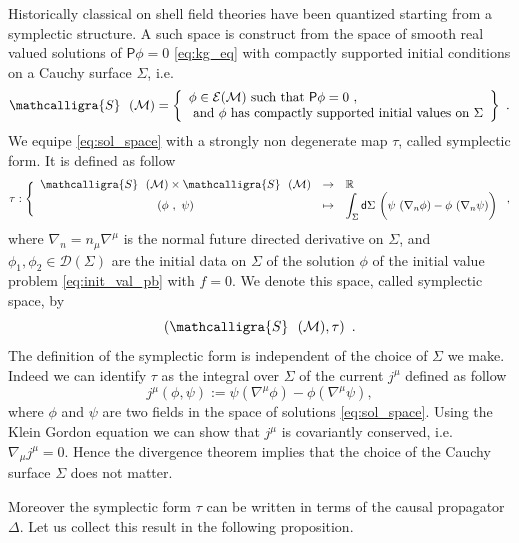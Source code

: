 \documentclass[11pt]{book}
\newcommand{\bigint}{\displaystyle\int}
\newcommand{\Dcal}{\mathcal{D}}
\newcommand{\Ecal}{\mathcal{E}}
\newcommand{\Mcal}{\mathcal{M}}
\newcommand{\Rbb}{\mathbb{R}}
\newcommand{\Psf}{\mathsf{P}}
\newcommand{\dsf}{\mathsf{d}}
\theoremstyle{break}
\begin{document}
Historically classical on shell field theories have been quantized starting from a symplectic structure. A such space is construct from the space of smooth real valued solutions of $\Psf \phi = 0$ \eqref{eq:kg_eq} with compactly supported initial conditions on a Cauchy surface $\Sigma$, i.e.
%
\begin{equation}
\mathcalligra{S} \ \ (\Mcal) = \left\{ 
\begin{array}{l}
\phi \in \Ecal(\Mcal) \mbox{ such that } \Psf\phi=0 \ , \\
\mbox{ and } \phi \mbox{ has compactly supported initial values on } \Sigma 
\end{array}
\right\} \ .
\label{eq:sol_space}
\end{equation}
%
We equipe \eqref{eq:sol_space} with a strongly non degenerate map $\tau$, called symplectic form. It is defined as follow
%
\begin{equation*}
\tau : \Bigg\{
\begin{array}{ccl}
\mathcalligra{S} \ \ (\Mcal) \times \mathcalligra{S} \ \ (\Mcal) & \to & \Rbb \\
(\phi \ , \ \psi) & \mapsto & \bigint_\Sigma  \dsf \Sigma \ \bigg( \psi \ (\nabla_n \phi) - \phi \ (\nabla_n \psi) \bigg)
\end{array}
\ ,
\end{equation*}
%
where $\nabla_n = n_\mu \nabla^\mu$ is the normal future directed derivative on $\Sigma$, and $\phi_1, \phi_2 \in \Dcal(\Sigma)$  are the initial data on $\Sigma$ of the solution $\phi$ of the initial value problem \eqref{eq:init_val_pb} with $f=0$. We denote this space, called symplectic space, by 
%
\begin{equation*}
\left(\mathcalligra{S} \ \ (\Mcal),\tau\right) \ . 
\end{equation*}
%
The definition of the symplectic form is independent of the choice of $\Sigma$ we make. Indeed we can identify $\tau$ as the integral over $\Sigma$ of the current $j^\mu$ defined as follow
%
\begin{equation*}
j^\mu (\phi,\psi) := \psi (\nabla^\mu \phi) - \phi (\nabla^\mu \psi),  
\label{eq:current}
\end{equation*}
%
where $\phi$ and $\psi$ are two fields in the space of solutions \eqref{eq:sol_space}. Using the Klein Gordon equation we can show that $j^\mu$ is covariantly conserved, i.e. $\nabla_\mu j^\mu = 0$. Hence the divergence theorem implies that the choice of the Cauchy surface $\Sigma$ does not matter. 


Moreover the symplectic form $\tau$ can be written in terms of the causal propagator $\Delta$. Let us collect this result in the following proposition.
\end{document}

